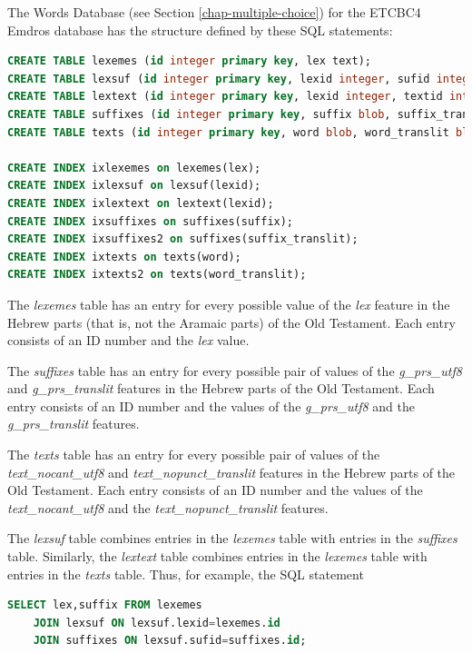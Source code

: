 \documentclass[11pt,oneside,a4paper]{memoir}
\begin{document}
The Words Database (see Section \ref{chap-multiple-choice}) for the ETCBC4 Emdros database has the
structure defined by these SQL statements:

\begin{lstlisting}[language=SQL]
CREATE TABLE lexemes (id integer primary key, lex text);
CREATE TABLE lexsuf (id integer primary key, lexid integer, sufid integer);
CREATE TABLE lextext (id integer primary key, lexid integer, textid integer);
CREATE TABLE suffixes (id integer primary key, suffix blob, suffix_translit blot);
CREATE TABLE texts (id integer primary key, word blob, word_translit blob);

CREATE INDEX ixlexemes on lexemes(lex);
CREATE INDEX ixlexsuf on lexsuf(lexid);
CREATE INDEX ixlextext on lextext(lexid);
CREATE INDEX ixsuffixes on suffixes(suffix);
CREATE INDEX ixsuffixes2 on suffixes(suffix_translit);
CREATE INDEX ixtexts on texts(word);
CREATE INDEX ixtexts2 on texts(word_translit);
\end{lstlisting}

The \emph{lexemes} table has an entry for every possible value of the \emph{lex} feature in the
Hebrew parts (that is, not the Aramaic parts) of the Old Testament. Each entry consists of an ID
number and the \emph{lex} value.

The \emph{suffixes} table has an entry for every possible pair of values of the \emph{g\_prs\_utf8}
and \emph{g\_prs\_translit} features in the Hebrew parts of the Old Testament. Each entry consists
of an ID number and the values of the \emph{g\_prs\_utf8} and the \emph{g\_prs\_translit} features.

The \emph{texts} table has an entry for every possible pair of values of the
\emph{text\_nocant\_utf8} and \emph{text\_nopunct\_translit} features
in the Hebrew parts of the Old Testament. Each entry consists of an ID number and the values of the
\emph{text\_nocant\_utf8} and the \emph{text\_nopunct\_translit} features.

The \emph{lexsuf} table combines entries in the \emph{lexemes} table with entries in the
\emph{suffixes} table. Similarly, the \emph{lextext} table combines entries in the \emph{lexemes}
table with entries in the \emph{texts} table. Thus, for example, the SQL statement

\begin{lstlisting}[language=SQL]
SELECT lex,suffix FROM lexemes
    JOIN lexsuf ON lexsuf.lexid=lexemes.id
    JOIN suffixes ON lexsuf.sufid=suffixes.id;
\end{lstlisting}
\end{document}
